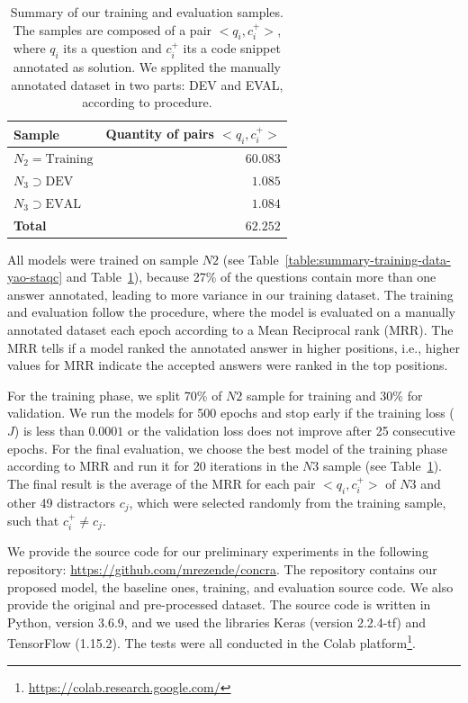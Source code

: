 \documentclass[sigconf]{acmart}
\begin{document}
\begin{table}[h]
\centering
\begin{tabular}{ l r  }
 \hline
 \textbf{Sample} & \textbf{Quantity of pairs $<q_{i}, c_{i}^{+}>$}\\
 \hline
 $N_{2} = \text{Training}$ & $60.083$\\
 
 $N_{3} \supset \text{DEV}$ & $1.085$ \\
 
 $N_{3} \supset \text{EVAL}$ & $1.084$\\
 \hline
 \textbf{Total} & $\bm{62.252}$\\
 \hline
\end{tabular}
\caption{Summary of our training and evaluation samples. The samples are composed of a pair $<q_{i}, c_{i}^{+}>$, where $q_{i}$ its a question and $c_{i}^{+}$ its a code snippet annotated as solution. We spplited the manually annotated dataset in two parts: DEV and EVAL, according to \cite{iyer-etal-2016-summarizing} procedure. }
\label{table:training-sample-division}
\end{table}

All models were trained on sample $N2$ (see Table~\ref{table:summary-training-data-yao-staqc} and Table~\ref{table:training-sample-division}), because 27\% of the questions contain more than one answer annotated, leading to more variance in our training dataset. The training and evaluation follow the \citet{iyer-etal-2016-summarizing} procedure, where the model is evaluated on a manually annotated dataset each epoch according to a Mean Reciprocal rank (MRR). The MRR tells if a model ranked the annotated answer in higher positions, i.e., higher values for MRR indicate the accepted answers were ranked in the top positions.

For the training phase, we split 70\% of $N2$ sample for training and 30\% for validation. We run the models for 500 epochs and stop early if the training loss ($J$) is less than $0.0001$ or the validation loss does not improve after 25 consecutive epochs. For the final evaluation, we choose the best model of the training phase according to MRR and run it for 20 iterations in the $N3$ sample (see Table~\ref{table:training-sample-division}). The final result is the average of the MRR for each pair $<q_{i}, c_{i}^{+}>$ of $N3$ and other 49 distractors $c_{j}$, which were selected randomly from the training sample, such that $c_{i}^{+} \neq c_{j}$.

We provide the source code for our preliminary experiments in the following repository: \url{https://github.com/mrezende/concra}. The repository contains our proposed model, the baseline ones, training, and evaluation source code. We also provide the original and pre-processed dataset. The source code is written in Python, version 3.6.9, and we used the libraries Keras (version 2.2.4-tf) and TensorFlow (1.15.2). The tests were all conducted in the Colab platform\footnote{\url{https://colab.research.google.com/}}.
\end{document}
